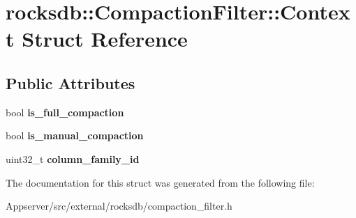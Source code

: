 \hypertarget{structrocksdb_1_1CompactionFilter_1_1Context}{}\section{rocksdb\+:\+:Compaction\+Filter\+:\+:Context Struct Reference}
\label{structrocksdb_1_1CompactionFilter_1_1Context}
\subsection*{Public Attributes}
\begin{DoxyCompactItemize}
\item 
bool {\bfseries is\+\_\+full\+\_\+compaction}\hypertarget{structrocksdb_1_1CompactionFilter_1_1Context_a0630a01ff4a4abe64c7bfb24afae471c}{}\label{structrocksdb_1_1CompactionFilter_1_1Context_a0630a01ff4a4abe64c7bfb24afae471c}

\item 
bool {\bfseries is\+\_\+manual\+\_\+compaction}\hypertarget{structrocksdb_1_1CompactionFilter_1_1Context_a057a1f989d02ede24bc605537b469cce}{}\label{structrocksdb_1_1CompactionFilter_1_1Context_a057a1f989d02ede24bc605537b469cce}

\item 
uint32\+\_\+t {\bfseries column\+\_\+family\+\_\+id}\hypertarget{structrocksdb_1_1CompactionFilter_1_1Context_a6cf09674c760f51139cf65989bb121ab}{}\label{structrocksdb_1_1CompactionFilter_1_1Context_a6cf09674c760f51139cf65989bb121ab}

\end{DoxyCompactItemize}


The documentation for this struct was generated from the following file\+:\begin{DoxyCompactItemize}
\item 
Appserver/src/external/rocksdb/compaction\+\_\+filter.\+h\end{DoxyCompactItemize}
